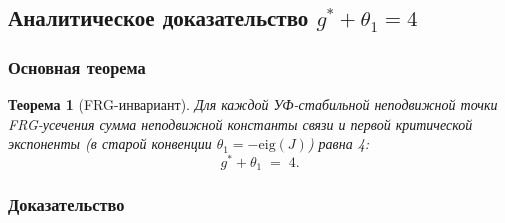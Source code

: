 \documentclass[11pt,a4paper]{article}
\newtheorem{theorem}{Теорема}[section]
\theoremstyle{definition}
\begin{document}
\subsection{Аналитическое доказательство \texorpdfstring{$g^* + \theta_1 = 4$}{g\textasciicircum * + \_1 = 4}}
\label{subsec:frg-proof}

\subsubsection{Основная теорема}

\begin{theorem}[FRG-инвариант]
\label{thm:invariant}
Для каждой УФ-стабильной неподвижной точки FRG-усечения
сумма неподвижной константы связи и первой критической экспоненты
(в \emph{старой} конвенции $\theta_1 = -\mathrm{eig}(J)$) равна 4:
\begin{equation}
    \boxed{
    g^* + \theta_1 \;=\; 4.
    }
    \label{eq:invariant-main}
\end{equation}
\end{theorem}

\subsubsection{Доказательство}
\end{document}
